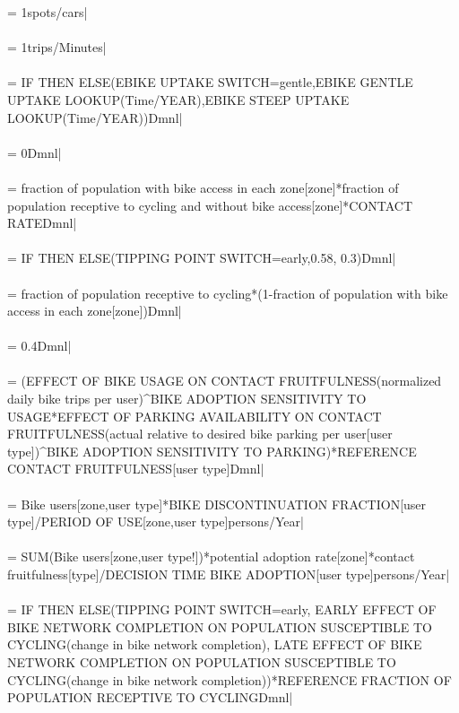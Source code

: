  = 1spots/cars| \\ \\ 
 = 1trips/Minutes| \\ \\ 
 = IF THEN ELSE(EBIKE UPTAKE SWITCH=gentle,EBIKE GENTLE UPTAKE LOOKUP(Time/YEAR),EBIKE STEEP UPTAKE LOOKUP(Time/YEAR))Dmnl| \\ \\ 
 = 0Dmnl| \\ \\ 
 = fraction of population with bike access in each zone[zone]*fraction of population receptive to cycling and without bike access[zone]*CONTACT RATEDmnl| \\ \\ 
 = IF THEN ELSE(TIPPING POINT SWITCH=early,0.58, 0.3)Dmnl| \\ \\ 
 = fraction of population receptive to cycling*(1-fraction of population with bike access in each zone[zone])Dmnl| \\ \\ 
 = 0.4Dmnl| \\ \\ 
 = (EFFECT OF BIKE USAGE ON CONTACT FRUITFULNESS(normalized daily bike trips per user)\^{}BIKE ADOPTION SENSITIVITY TO USAGE*EFFECT OF PARKING AVAILABILITY ON CONTACT FRUITFULNESS(actual relative to desired bike parking per user[user type])\^{}BIKE ADOPTION SENSITIVITY TO PARKING)*REFERENCE CONTACT FRUITFULNESS[user type]Dmnl| \\ \\ 
 = Bike users[zone,user type]*BIKE DISCONTINUATION FRACTION[user type]/PERIOD OF USE[zone,user type]persons/Year| \\ \\ 
 = SUM(Bike users[zone,user type!])*potential adoption rate[zone]*contact fruitfulness[\user type]/DECISION TIME BIKE ADOPTION[user type]persons/Year| \\ \\ 
 = IF THEN ELSE(TIPPING POINT SWITCH=early, EARLY EFFECT OF BIKE NETWORK COMPLETION ON POPULATION SUSCEPTIBLE TO CYCLING(change in bike network completion), LATE EFFECT OF BIKE NETWORK COMPLETION ON POPULATION SUSCEPTIBLE TO CYCLING(change in bike network completion))*REFERENCE FRACTION OF POPULATION RECEPTIVE TO CYCLINGDmnl| \\ \\ 
